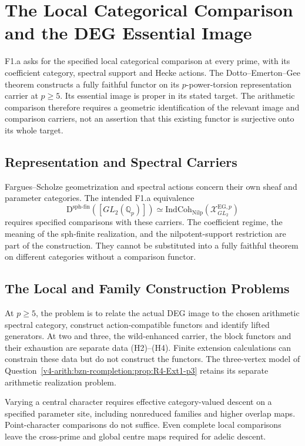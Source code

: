 \chapter{The Local Categorical Comparison and the DEG Essential Image}
\label{v4-arith:deg-f1a}

F1.a asks for the specified local categorical comparison at every
prime, with its coefficient category, spectral support and Hecke
actions. The Dotto--Emerton--Gee theorem constructs a fully faithful
functor on its \(p\)-power-torsion representation carrier at
\(p\ge5\). Its essential image is proper in its stated target.
The arithmetic comparison therefore requires a geometric
identification of the relevant image and comparison carriers, not
an assertion that this existing functor is surjective onto its
whole target.

\section{Representation and Spectral Carriers}
\label{v4-arith:deg-f1a:context}
Fargues--Scholze geometrization and spectral actions concern their
own sheaf and parameter categories. The intended F1.a equivalence
\[
 \mathrm D^{\mathrm{sph\text{-}fin}}([GL_2(\mathbb Q_p)])
 \simeq\mathrm{IndCoh}_{\mathrm{Nilp}}(\mathcal X^{\mathrm{EG},p}_{GL_2})
\]
requires specified comparisons with these carriers. The coefficient
regime, the meaning of the sph-finite realization, and the
nilpotent-support restriction are part of the construction.
They cannot be substituted into a fully faithful theorem on different
categories without a comparison functor.

\section{The Local and Family Construction Problems}
\label{v4-arith:deg-f1a:table}
At \(p\ge5\), the problem is to relate the actual DEG image to the
chosen arithmetic spectral category, construct action-compatible
functors and identify lifted generators. At two and three, the
wild-enhanced carrier, the block functors and their exhaustion are
separate data (H2)--(H4). Finite extension calculations can constrain
these data but do not construct the functors. The three-vertex model
of Question~\ref{v4-arith:bzn-rcompletion:prop:R4-Ext1-p3} retains
its separate arithmetic realization problem.

Varying a central character requires effective category-valued
descent on a specified parameter site, including nonreduced families
and higher overlap maps. Point-character comparisons do not suffice.
Even complete local comparisons leave the cross-prime and global
centre maps required for adelic descent.

